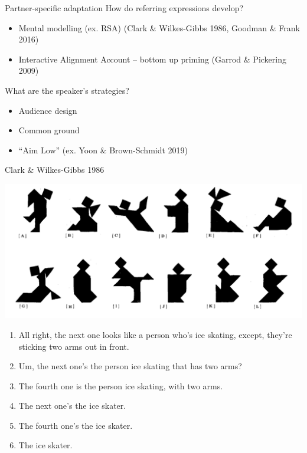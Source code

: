 \documentclass[ 12pt, xcolor=beamer,table,usenames,dvipsnames, ignorenonframetext, ngerman]{beamer}
\begin{document}
\begin{frame}{Partner-specific adaptation}\pause
		How do referring expressions develop?\pause
			\begin{itemize} 
		\item Mental modelling (ex. RSA) (Clark \& Wilkes-Gibbs 1986, Goodman \& Frank 2016) \pause
		\item Interactive Alignment Account -- bottom up priming (Garrod \& Pickering 2009)
	\end{itemize}\pause
	What are the speaker's strategies? \pause
	\begin{itemize}
		\item Audience design
		\item Common ground
		\item ``Aim Low'' (ex. Yoon \& Brown-Schmidt 2019)
	\end{itemize}

\end{frame}

%
\begin{frame}{Clark \& Wilkes-Gibbs 1986}
	\pause
	\vspace{-.2cm}
\begin{center}
	\includegraphics[width=.7\textwidth]{../images/clark_tangrams.png}
	\end{center}
\vspace{-.4cm}
\pause
\begin{small}
\begin{enumerate}
	\setlength{\itemsep}{-2pt}

	\item All right, the next one looks like a person who's ice skating, except, they're sticking two arms out in front. \pause
	\item Um, the next one's the person ice skating that has two arms? \pause
	\item The fourth one is the person ice skating, with two arms. \pause
	\item The next one's the ice skater. \pause
	\item The fourth one's the ice skater. \pause
	\item The ice skater.
	\end{enumerate}
\end{small}
\end{frame}
\end{document}
